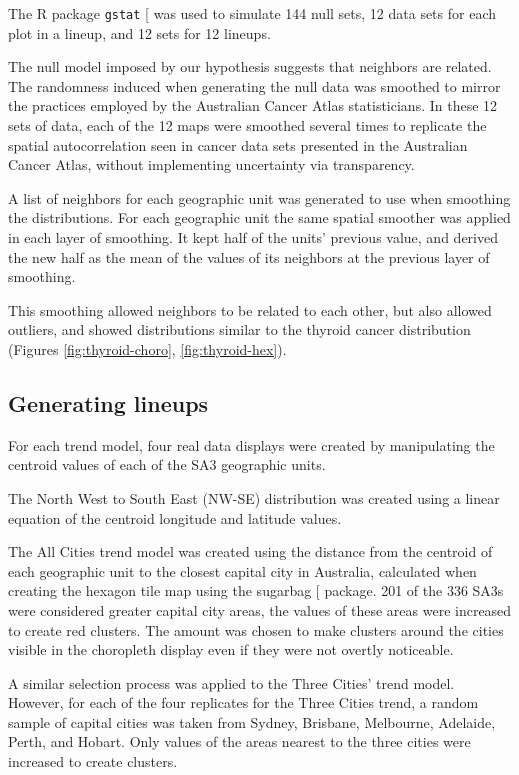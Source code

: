 \documentclass[
]{article}
\begin{document}
The R package \texttt{gstat} {[}\citeproc{ref-gstat}{17}{]} was used to
simulate 144 null sets, 12 data sets for each plot in a lineup, and 12
sets for 12 lineups.

The null model imposed by our hypothesis suggests that neighbors are
related. The randomness induced when generating the null data was
smoothed to mirror the practices employed by the Australian Cancer Atlas
statisticians. In these 12 sets of data, each of the 12 maps were
smoothed several times to replicate the spatial autocorrelation seen in
cancer data sets presented in the Australian Cancer Atlas, without
implementing uncertainty via transparency.

A list of neighbors for each geographic unit was generated to use when
smoothing the distributions. For each geographic unit the same spatial
smoother was applied in each layer of smoothing. It kept half of the
units' previous value, and derived the new half as the mean of the
values of its neighbors at the previous layer of smoothing.

This smoothing allowed neighbors to be related to each other, but also
allowed outliers, and showed distributions similar to the thyroid cancer
distribution (Figures \ref{fig:thyroid-choro}, \ref{fig:thyroid-hex}).

\subsection{Generating lineups}\label{generating-lineups}

For each trend model, four real data displays were created by
manipulating the centroid values of each of the SA3 geographic units.

The North West to South East (NW-SE) distribution was created using a
linear equation of the centroid longitude and latitude values.

The All Cities trend model was created using the distance from the
centroid of each geographic unit to the closest capital city in
Australia, calculated when creating the hexagon tile map using the
sugarbag {[}\citeproc{ref-sugarbag}{1}{]} package. 201 of the 336 SA3s
were considered greater capital city areas, the values of these areas
were increased to create red clusters. The amount was chosen to make
clusters around the cities visible in the choropleth display even if
they were not overtly noticeable.

A similar selection process was applied to the Three Cities' trend
model. However, for each of the four replicates for the Three Cities
trend, a random sample of capital cities was taken from Sydney,
Brisbane, Melbourne, Adelaide, Perth, and Hobart. Only values of the
areas nearest to the three cities were increased to create clusters.
\end{document}
